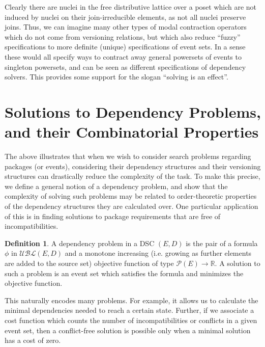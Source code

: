 \documentclass[hoptionsi,review,screen,format=acmsmall]{acmart}
\theoremstyle{definition}
\newtheorem{definition}{Definition}[section]
\newcommand{\UBLc}{\mathcal{UBL}}
\newcommand{\Pc}{\mathcal{P}}
\begin{document}
Clearly there are nuclei in the free distributive lattice over a poset which are not induced by nuclei on their join-irreducible elements, as not all nuclei preserve joins. Thus, we can imagine many other types of modal contraction operators which do not come from versioning relations, but which also reduce ``fuzzy'' specifications to more definite (unique) specifications of event sets. In  a sense these would all specify ways to contract away general powersets of events to singleton powersets, and can be seen as different specifications of dependency solvers. This provides some support for the slogan ``solving is an effect''.

\section{Solutions to Dependency Problems, and their Combinatorial Properties}
The above illustrates that when we wish to consider search problems regarding packages (or events), considering their dependency structures and their versioning structures can drastically reduce the complexity of the task. To make this precise, we define a general notion of a dependency problem, and show that the complexity of solving such problems may be related to order-theoretic properties of the dependency structures they are calculated over. One particular application of this is in finding solutions to package requirements that are free of incompatibilities.

\begin{definition}
A dependency problem in a DSC \((E,D)\) is the pair of a formula \(\phi\) in \(\UBLc(E,D)\) and a monotone increasing (i.e. growing as further elements are added to the source set) objective function of type \(\Pc(E) \rightarrow \mathbb{R}\). A solution to such a problem is an event set which satisfies the formula and minimizes the objective function.
\end{definition}

This naturally encodes many problems. For example, it allows us to calculate the minimal dependencies needed to reach a certain state. Further, if we associate a cost function which counts the number of incompatibilities or conflicts in a given event set, then a conflict-free solution is possible only when a minimal solution has a cost of zero.
\end{document}

